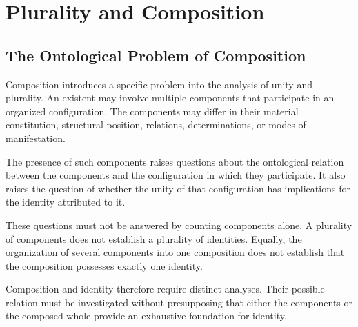 %
%
%
%

\section{Plurality and Composition}
\label{sec:plurality-and-composition}

\subsection{The Ontological Problem of Composition}

Composition introduces a specific problem into the analysis
of unity and plurality. An existent may involve multiple
components that participate in an organized configuration.
The components may differ in their material constitution,
structural position, relations, determinations, or modes
of manifestation.

The presence of such components raises questions about
the ontological relation between the components and the
configuration in which they participate. It also raises
the question of whether the unity of that configuration
has implications for the identity attributed to it.

These questions must not be answered by counting components
alone. A plurality of components does not establish a
plurality of identities. Equally, the organization of
several components into one composition does not establish
that the composition possesses exactly one identity.

Composition and identity therefore require distinct
analyses. Their possible relation must be investigated
without presupposing that either the components or the
composed whole provide an exhaustive foundation for identity.

